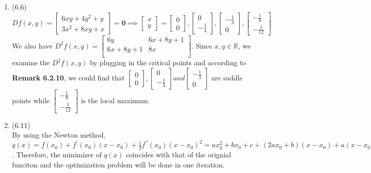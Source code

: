 \documentclass[letterpaper,12pt]{article}
\theoremstyle{definition}
\begin{document}
\begin{enumerate}
	 \item(6.6)\\
	$Df(x, y) = \begin{bmatrix} 6xy + 4y^2 + y \\ 3x^2 + 8xy +x \end{bmatrix} = \textbf{0} \implies \begin{bmatrix} x \\ y \end{bmatrix} = \begin{bmatrix} 0 \\ 0 \end{bmatrix},  \begin{bmatrix} 0 \\ -\frac{1}{4} \end{bmatrix},  \begin{bmatrix} -\frac{1}{3} \\ 0 \end{bmatrix},  \begin{bmatrix} -\frac{1}{9} \\ -\frac{1}{12} \end{bmatrix}  $\\
	We also have $D^{2}f(x, y) = \begin{bmatrix} 6y & 6x + 8y + 1\\ 6x + 8y + 1 & 8x \\\end{bmatrix}$. Since $x, y \in \mathbb{R}$, we examine the $D^{2}f(x, y)$ by plugging in the critical points and according to \textbf{Remark 6.2.10}, we could find that $\begin{bmatrix} 0 \\ 0 \end{bmatrix}, \begin{bmatrix} 0 \\ -\frac{1}{4} \end{bmatrix} and  \begin{bmatrix} -\frac{1}{3} \\ 0 \end{bmatrix}$ are saddle points while $\begin{bmatrix} -\frac{1}{9} \\ -\frac{1}{12}\end{bmatrix}$ is the local maximum.\\

	\item(6.11)\\
	By using the Newton method, $q(x) = f(x_{0}) + f^{'}(x_{0})(x - x_{0}) + \frac{1}{2}f^{''}(x_{0})(x - x_{0})^{2} = ax_{0}^2 + bx_{0} + c +(2ax_{0} + b)(x - x_{0}) + a(x - x_{0})^{2} = zx^2 + bx +c$. Therefore, the minimizer of $q(x)$ coincides with that of the orignial funciton and the optimization problem will be done in one iteration.\\



	
	

\end{enumerate}

\vspace{25mm}
\end{document}
